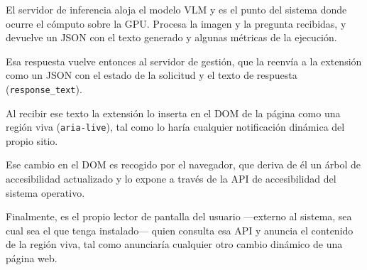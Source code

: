 El servidor de inferencia aloja el modelo VLM y es el punto del sistema donde ocurre el cómputo sobre la GPU. Procesa la imagen y la pregunta recibidas, y devuelve un JSON con el texto generado y algunas métricas de la ejecución.

Esa respuesta vuelve entonces al servidor de gestión, que la reenvía a la extensión como un JSON con el estado de la solicitud y el texto de respuesta (\texttt{response\_text}).

Al recibir ese texto la extensión lo inserta en el DOM de la página como una región viva (\texttt{aria-live}), tal como lo haría cualquier notificación dinámica del propio sitio.

Ese cambio en el DOM es recogido por el navegador, que deriva de él un árbol de accesibilidad actualizado y lo expone a través de la API de accesibilidad del sistema operativo.

Finalmente, es el propio lector de pantalla del usuario —externo al sistema, sea cual sea el que tenga instalado— quien consulta esa API y anuncia el contenido de la región viva, tal como anunciaría cualquier otro cambio dinámico de una página web.

